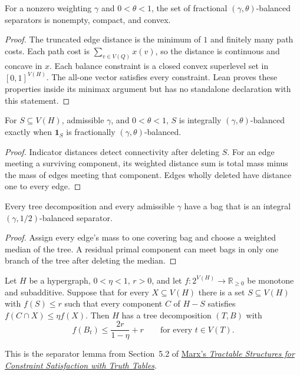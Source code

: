 \begin{lemma}
\label{lem:fractional-separator-convexity}
For a nonzero weighting $\gamma$ and $0<\theta<1$, the set of fractional
$(\gamma,\theta)$-balanced separators is nonempty, compact, and convex.
\end{lemma}
\begin{proof}
The truncated edge distance is the minimum of $1$ and finitely many path
costs. Each path cost is $\sum_{v\in V(Q)}x(v)$, so the distance is
continuous and concave in $x$.
Each balance constraint is a closed convex superlevel set in
$[0,1]^{V(H)}$. The all-one vector satisfies every constraint.
Lean proves these properties inside its minimax argument but has no
standalone declaration with this statement.
\end{proof}

\begin{lemma}
\label{lem:indicator-equivalence}
\leanok
For $S\subseteq V(H)$, admissible $\gamma$, and $0<\theta<1$,
$S$ is integrally $(\gamma,\theta)$-balanced exactly when $\mathbf1_S$ is
fractionally $(\gamma,\theta)$-balanced.
\end{lemma}
\begin{proof}\leanok
Indicator distances detect connectivity after deleting $S$. For an edge
meeting a surviving component, its weighted distance sum is total mass minus
the mass of edges meeting that component. Edges wholly deleted have distance
one to every edge.
\end{proof}

\begin{lemma}
\label{lem:balanced-bag}
\leanok
Every tree decomposition and every admissible $\gamma$ have a bag that is an
integral $(\gamma,1/2)$-balanced separator.
\end{lemma}
\begin{proof}\leanok
Assign every edge's mass to one covering bag and choose a weighted median
of the tree. A residual primal component can meet bags in only one branch
of the tree after deleting the median.
\end{proof}

\begin{lemma}
\label{lem:recursive-decomposition}
Let $H$ be a hypergraph, $0<\eta<1$, $r>0$, and let
$f:2^{V(H)}\to\mathbb R_{\ge0}$ be monotone and subadditive.
Suppose that for every $X\subseteq V(H)$ there is a set $S\subseteq V(H)$
with $f(S)\le r$ such that every component $C$ of $H-S$ satisfies
$f(C\cap X)\le\eta f(X)$. Then $H$ has a tree decomposition $(T,B)$ with
\[
 f(B_t)\le\frac{2r}{1-\eta}+r
 \qquad\text{for every }t\in V(T).
\]
\end{lemma}
This is the separator lemma from Section~5.2 of
\href{https://doi.org/10.1007/s00224-009-9248-9}{Marx's
\emph{Tractable Structures for Constraint Satisfaction with Truth Tables}}.

